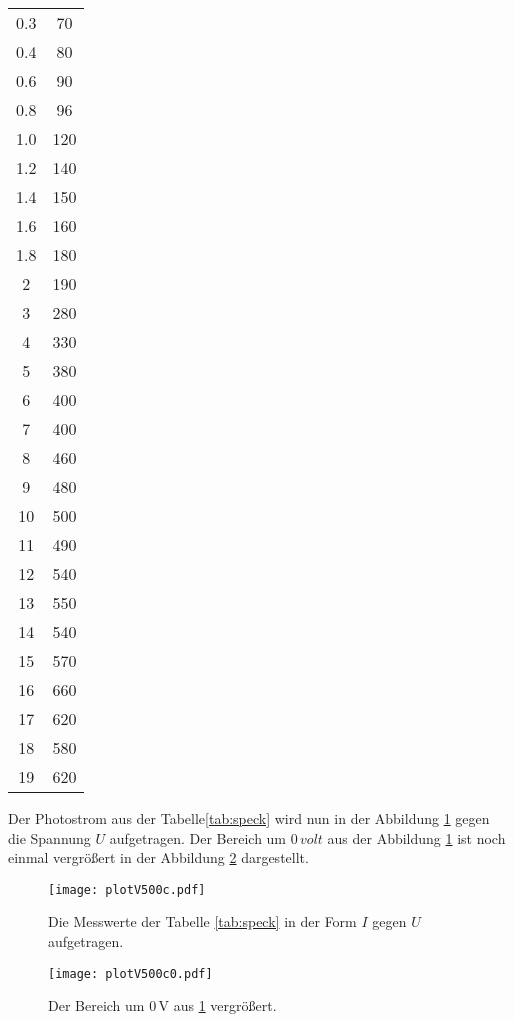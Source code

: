 \begin{center}
\begin{longtable}{c c}
  0.3  &   70\\
  0.4  &   80\\
  0.6  &   90\\
  0.8  &   96\\
  1.0  &  120\\
  1.2  &  140\\
  1.4  &  150\\
  1.6 &  160\\
  1.8 &  180\\
  2   &  190\\
  3   &  280\\
  4   &  330\\
  5   &  380\\
  6   &  400\\
  7   &  400\\
  8   &  460\\
  9   &  480\\
  10  &  500\\
  11  &  490\\
  12  &  540\\
  13  &  550\\
  14  &  540\\
  15  &  570\\
  16  &  660\\
  17  &  620\\
  18  &  580\\
  19  &  620\\
\end{longtable}
\end{center}

Der Photostrom aus der Tabelle\ref{tab:speck} wird nun in der Abbildung \ref{fig:speck} gegen
die Spannung $U$ aufgetragen.
Der
Bereich um  $0\,\si{volt}$ aus der Abbildung \ref{fig:speck} ist
noch einmal vergrößert in der Abbildung \ref{fig:speckzoom} dargestellt.


\begin{figure}
 \centering
 \texttt{[image: plotV500c.pdf]}
 \caption{Die Messwerte der Tabelle \ref{tab:speck} in der Form
 $I$ gegen $U$ aufgetragen.}
 \label{fig:speck}
\end{figure}

\begin{figure}
 \centering
 \texttt{[image: plotV500c0.pdf]}
 \caption{Der Bereich um $0\,\si{\volt}$ aus \ref{fig:speck} vergrößert.}
 \label{fig:speckzoom}
\end{figure}
